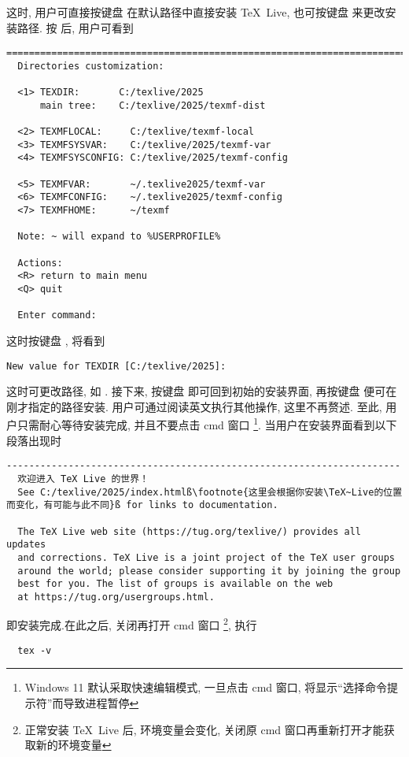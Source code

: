 这时, 用户可直接按键盘  在默认路径中直接安装 \TeX~Live,
也可按键盘  来更改安装路径.
按  后, 用户可看到
\begin{lstlisting}[language = {}]
  ==============================================================================
  Directories customization:
  
  <1> TEXDIR:       C:/texlive/2025
      main tree:    C:/texlive/2025/texmf-dist
  
  <2> TEXMFLOCAL:     C:/texlive/texmf-local
  <3> TEXMFSYSVAR:    C:/texlive/2025/texmf-var
  <4> TEXMFSYSCONFIG: C:/texlive/2025/texmf-config
  
  <5> TEXMFVAR:       ~/.texlive2025/texmf-var
  <6> TEXMFCONFIG:    ~/.texlive2025/texmf-config
  <7> TEXMFHOME:      ~/texmf
  
  Note: ~ will expand to %USERPROFILE%
  
  Actions:
  <R> return to main menu
  <Q> quit
  
  Enter command:
\end{lstlisting}
这时按键盘 , 将看到
\begin{lstlisting}[language = {}]
  New value for TEXDIR [C:/texlive/2025]:
\end{lstlisting}
这时可更改路径, 如 .
接下来, 按键盘  即可回到初始的安装界面,
再按键盘  便可在刚才指定的路径安装.
用户可通过阅读英文执行其他操作, 这里不再赘述. 
至此, 用户只需耐心等待安装完成, 并且不要点击 \textsf{cmd} 窗口%
\footnote{Windows 11 默认采取快速编辑模式, 一旦点击 \textsf{cmd} 窗口,
将显示``选择命令提示符''而导致进程暂停}. 
当用户在安装界面看到以下段落出现时
\begin{lstlisting}[language={},escapechar=ß]
  ----------------------------------------------------------------------
  欢迎进入 TeX Live 的世界！
  See C:/texlive/2025/index.htmlß\footnote{这里会根据你安装\TeX~Live的位置而变化，有可能与此不同}ß for links to documentation.
  
  The TeX Live web site (https://tug.org/texlive/) provides all updates
  and corrections. TeX Live is a joint project of the TeX user groups
  around the world; please consider supporting it by joining the group
  best for you. The list of groups is available on the web
  at https://tug.org/usergroups.html. 
\end{lstlisting}
即安装完成.在此之后, 关闭再打开 \textsf{cmd} 窗口%
\footnote{正常安装 \TeX~Live 后, 环境变量会变化,
关闭原 \textsf{cmd} 窗口再重新打开才能获取新的环境变量},
执行
\begin{lstlisting}
  tex -v
\end{lstlisting}
